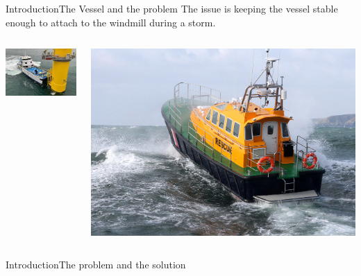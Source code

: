 \documentclass{beamer}
\begin{document}
\begin{frame}{Introduction}{The Vessel and the problem\vphantom{(y}}
  The issue is keeping the vessel stable enough to attach to the windmill during a storm.
\begin{columns}
    \begin{column}{0.48\textwidth}
      \includegraphics[width=1\textwidth]{images/docking_boat}
    \end{column}
    \begin{column}{0.48\textwidth}
        \includegraphics[width=1\textwidth]{images/boat2_storm}
    \end{column}
\end{columns}
\end{frame}


\begin{frame}{Introduction}{The problem and the solution\vphantom{(y}}
\vspace{-0.7em}
\end{frame}
\end{document}
